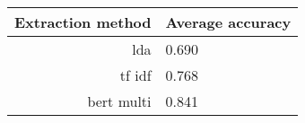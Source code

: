 \begin{tabular}{|r|l|}
  \hline
  Extraction method & Average accuracy \\ 
  \hline
  lda & 0.690 \\ 
  \hline
  tf idf & 0.768 \\ 
  \hline
  bert multi & 0.841 \\ 
  \hline
\end{tabular}
